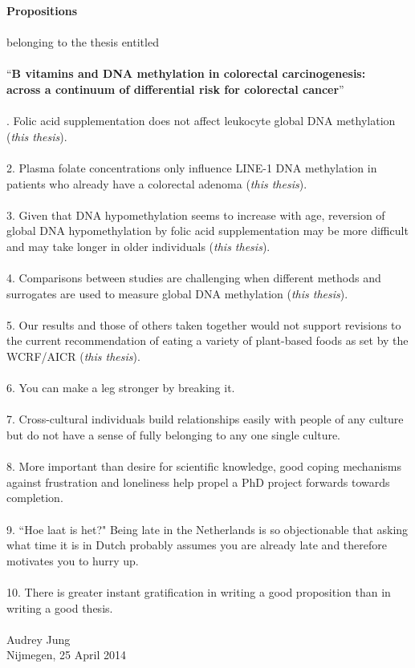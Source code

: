 \documentclass[10pt, letterpaper, twoside]{book}
\begin{document}
{\centering \textbf{\large Propositions}\\
\quad\\
belonging to the thesis entitled\\
\quad\\
``\textbf{B vitamins and DNA methylation in colorectal carcinogenesis:\\across a continuum of differential risk for colorectal cancer}''\\
}
\quad\\

.	Folic acid supplementation does not affect leukocyte global DNA methylation (\emph{this thesis}).\\
\quad\\
2.	Plasma folate concentrations only influence LINE-1 DNA methylation in patients who already have a colorectal adenoma (\emph{this thesis}).\\
\quad\\
3.	Given that DNA hypomethylation seems to increase with age, reversion of global DNA hypomethylation by folic acid supplementation may be more difficult and may take longer in older individuals (\emph{this thesis}).\\
\quad\\
4.	Comparisons between studies are challenging when different methods and surrogates are used to measure global DNA methylation (\emph{this thesis}).\\
\quad\\
5.	Our results and those of others taken together would not support revisions to the current recommendation of eating a variety of plant-based foods as set by the WCRF/AICR (\emph{this thesis}).\\
\quad\\
6.	You can make a leg stronger by breaking it.\\
\quad\\
7.	Cross-cultural individuals build relationships easily with people of any culture but do not have a sense of fully belonging to any one single culture.\\
\quad\\
8.	More important than desire for scientific knowledge, good coping mechanisms against frustration and loneliness help propel a PhD project forwards towards completion.\\
\quad\\
9. ``Hoe laat is het?" Being late in the Netherlands is so objectionable that asking what time it is in Dutch probably assumes you are already late and therefore motivates you to hurry up.\\
\quad\\
10.	There is greater instant gratification in writing a good proposition than in writing a good thesis.\\

\quad\\

\noindent
Audrey Jung\\
Nijmegen, 25 April 2014
\end{document}
